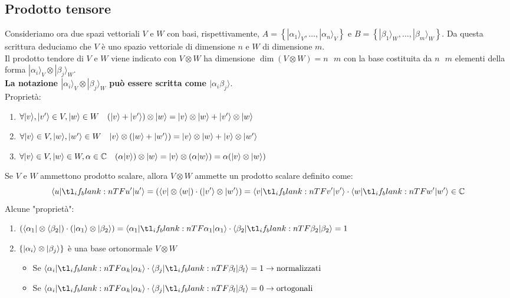 \documentclass[12pt, a4paper]{report}
\begin{document}
\subsection{Prodotto tensore}
Consideriamo ora due spazi vettoriali $V$ e $W$ con basi, rispettivamente, $A=\left\{|\alpha_{1}\rangle_{V},\ldots,|\alpha_{n}\rangle_{V}\right\}$ e $B=\left\{|\beta_{1}\rangle_{W},\ldots,|\beta_{m}\rangle_{W}\right\}$. Da questa scrittura deduciamo che $V$ è uno spazio vettoriale di dimensione $n$ e $W$ di dimensione $m$.\\
Il prodotto tendore di $V$ e $W$ viene indicato con $V\otimes W$ ha dimensione $\dim(V\otimes W)=n\text{ }m$  con la base costituita da $n\text{ }m$ elementi della forma $|\alpha_{i}\rangle_{V}\otimes|\beta_{j}\rangle_{W}$.\\
\textbf{La notazione $|\alpha_{i}\rangle_{V}\otimes|\beta_{j}\rangle_{W}$ può essere scritta come $|\alpha_{i}\beta_{j}\rangle$}.\\
Proprietà:
\begin{enumerate}
    \item $\forall | v \rangle,| v' \rangle \in V, | w \rangle \in W \quad (| v \rangle+| v' \rangle)\otimes| w \rangle = | v \rangle\otimes| w \rangle+| v' \rangle\otimes| w \rangle$
    \item $\forall| v \rangle\in V, | w \rangle,| w' \rangle\in W \quad | v \rangle\otimes (| w \rangle+| w' \rangle)=| v \rangle\otimes| w \rangle+| v \rangle\otimes| w' \rangle$
    \item $\forall| v \rangle\in V,| w \rangle\in W,\alpha \in \mathbb{C} \quad (\alpha| v \rangle)\otimes| w \rangle=| v \rangle\otimes(\alpha| w \rangle)=\alpha(| v \rangle\otimes| w \rangle)$
\end{enumerate}
Se $V$ e $W$ ammettono prodotto scalare, allora $V\otimes W$ ammette un prodotto scalare definito come:
\begin{equation*}
    \braket{u}{u'}=(\bra{v}\otimes\bra{w})\cdot(\ket{v'}\otimes\ket{w'})=\braket{v}{v'}\cdot\braket{w}{w'} \in \mathbb{C}
\end{equation*}
Alcune "proprietà":
\begin{enumerate}
    \item $(\bra{\alpha_{1}}\otimes\bra{\beta_{2}})\cdot(\ket{\alpha_{1}}\otimes\ket{\beta_{2}}) = \braket{\alpha_{1}}{\alpha_{1}}\cdot\braket{\beta_{2}}{\beta_{2}}=1$
    \item $\left\{| \alpha_{i} \rangle\otimes| \beta_{j} \rangle\right\}$ è una base ortonormale $V\otimes W$ \begin{itemize}
        \item Se $\braket{\alpha_{i}}{\alpha_{k}}\cdot\braket{\beta_{j}}{\beta_{l}}=1 \rightarrow \text{normalizzati}$
        \item Se $\braket{\alpha_{i}}{\alpha_{k}}\cdot\braket{\beta_{j}}{\beta_{l}}=0 \rightarrow \text{ortogonali}$
    \end{itemize}
\end{enumerate}
\end{document}
